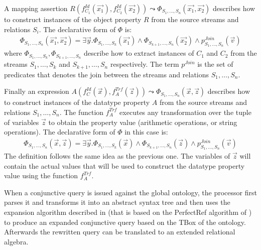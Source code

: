 A mapping assertion $R(f_{C_1}^{Id}(\vec{x_1}),f_{C_2}^{Id}(\vec{x_2})) \leadsto \Phi_{S_1,\ldots,S_n}(\vec{x_1},\vec{x_2})$ describes how to construct instances of the object property $R$ from the source streams and relations $S_i$. 
The declarative form of $\Phi$ is:
\begin{align*}
\Phi_{S_1,\ldots,S_n}(\vec{x_1},\vec{x_2})= \exists\vec{y}.\Phi_{S_1,\ldots,S_k}(\vec{x_1}) \wedge \Phi_{S_{k+1},\ldots,S_n}(\vec{x_2}) \wedge p_{S_1,\ldots,S_n}^{Join}(\vec{v})
%
\end{align*}
where $\Phi_{S_1,\ldots,S_k}, \Phi_{S_{k+1},\ldots,S_n}$ describe how to extract instances of $C_1$ and $C_2$ from the streams $S_1,\ldots,S_k$ and $S_{k+1},\ldots,S_n$ respectively. 
The term $p^{Join}$ is the set of predicates that denotes the join between the streams and relations $S_1,\ldots,S_n$.

Finally an expression $A(f_C^{Id}(\vec{x}),f_A^{Trf}(\vec{z})) \leadsto \Phi_{S_1,\ldots,S_n}(\vec{x},\vec{z})$ describes how to construct instances of the datatype property $A$ from the source streams and relations $S_1,\ldots,S_n$. 
The function $f_A^{Trf}$ executes any transformation over the tuple of variables $\vec{z}$ to obtain the property value (\eg arithmetic operations, or string operations). 
The declarative form of $\Phi$ in this case is:
\begin{align*}
\Phi_{S_1,\ldots,S_n}(\vec{x},\vec{z})= \exists\vec{y}.\Phi_{S_1,\ldots,S_k}(\vec{x})  \wedge \Phi_{S_{k+1},\ldots,S_n}(\vec{z}) \wedge p_{S_1,\ldots,S_n}^{Join}(\vec{v})
%
\end{align*}
The definition follows the same idea as the previous one. 
The variables of $\vec{z}$ will contain the actual values that will be used to construct the datatype property value using the function $f_A^{Trf}$.

When a conjunctive query is issued against the global ontology, the processor first parses it and transforms it into an abstract syntax tree and then uses the expansion algorithm described in \cite{Barrasa_04} (that is based on the \textsf{PerfectRef} algorithm of \cite{Calvanese_05}) to produce an expanded conjunctive query based on the TBox of the ontology. 
Afterwards the rewritten query can be translated to an extended relational algebra.

